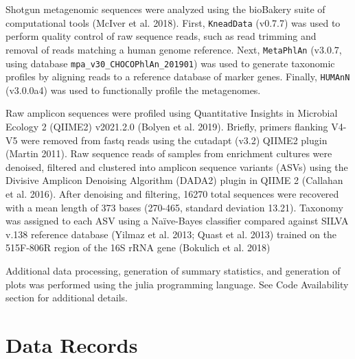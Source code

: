 \documentclass[fleqn,10pt]{wlscirep}
\begin{document}
Shotgun metagenomic sequences were analyzed using the bioBakery suite of computational tools (McIver et al. 2018).
First, \verb|KneadData| (v0.7.7) was used to perform quality control of raw sequence reads,
such as read trimming and removal of reads matching a human genome reference.
Next, \verb|MetaPhlAn| (v3.0.7, using database \verb|mpa_v30_CHOCOPhlAn_201901|) was used to generate taxonomic profiles
by aligning reads to a reference database of marker genes.
Finally, \verb|HUMAnN| (v3.0.0a4) was used to functionally profile the metagenomes.

Raw amplicon sequences were profiled using Quantitative Insights in Microbial Ecology 2 (QIIME2) v2021.2.0 (Bolyen et al. 2019).
Briefly, primers flanking V4-V5 were removed from fastq reads using the cutadapt (v3.2) QIIME2 plugin (Martin 2011).
Raw sequence reads of samples from enrichment cultures were denoised, filtered and clustered into amplicon sequence variants (ASVs) using the Divisive Amplicon Denoising Algorithm (DADA2) plugin in QIIME 2 (Callahan et al. 2016).
After denoising and filtering, 16270 total sequences were recovered with a mean length of 373 bases (270-465, standard deviation 13.21).
Taxonomy was assigned to each ASV using a Naïve-Bayes classifier compared against SILVA v.138 reference database (Yilmaz et al. 2013; Quast et al. 2013) trained on the 515F-806R region of the 16S rRNA gene (Bokulich et al. 2018)

Additional data processing, generation of summary statistics, and generation of plots was performed using the julia programming language.
See Code Availability section for additional details.

\section*{Data Records}

\end{document}
